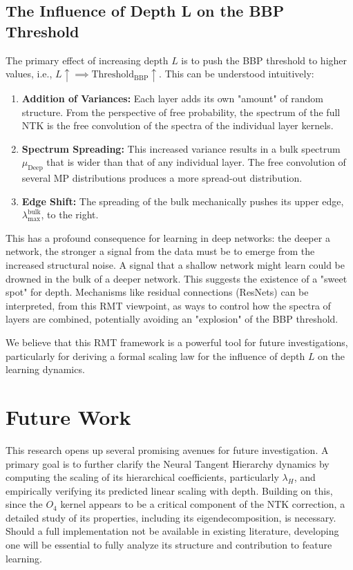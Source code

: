 \documentclass{article}
\begin{document}
\subsection{The Influence of Depth L on the BBP Threshold}
The primary effect of increasing depth $L$ is to push the BBP threshold to higher values, i.e., $L \uparrow \implies \text{Threshold}_{\text{BBP}} \uparrow$. This can be understood intuitively:
\begin{enumerate}
    \item \textbf{Addition of Variances:} Each layer adds its own "amount" of random structure. From the perspective of free probability, the spectrum of the full NTK is the free convolution of the spectra of the individual layer kernels.
    \item \textbf{Spectrum Spreading:} This increased variance results in a bulk spectrum $\mu_{\text{Deep}}$ that is wider than that of any individual layer. The free convolution of several MP distributions produces a more spread-out distribution.
    \item \textbf{Edge Shift:} The spreading of the bulk mechanically pushes its upper edge, $\lambda_{\max}^{\text{bulk}}$, to the right.
\end{enumerate}
This has a profound consequence for learning in deep networks: the deeper a network, the stronger a signal from the data must be to emerge from the increased structural noise. A signal that a shallow network might learn could be drowned in the bulk of a deeper network. This suggests the existence of a "sweet spot" for depth. Mechanisms like residual connections (ResNets) can be interpreted, from this RMT viewpoint, as ways to control how the spectra of layers are combined, potentially avoiding an "explosion" of the BBP threshold.

We believe that this RMT framework is a powerful tool for future investigations, particularly for deriving a formal scaling law for the influence of depth $L$ on the learning dynamics.


\section{Future Work}
This research opens up several promising avenues for future investigation. A primary goal is to further clarify the Neural Tangent Hierarchy dynamics by computing the scaling of its hierarchical coefficients, particularly $\lambda_H$, and empirically verifying its predicted linear scaling with depth. Building on this, since the $O_4$ kernel appears to be a critical component of the NTK correction, a detailed study of its properties, including its eigendecomposition, is necessary. Should a full implementation not be available in existing literature, developing one will be essential to fully analyze its structure and contribution to feature learning.
\end{document}
